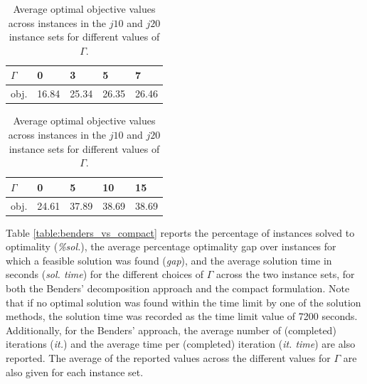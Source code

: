 \documentclass[a4paper,abstracton]{scrartcl}
\begin{document}
\begin{table}[h]
	\centering
	{\renewcommand{\arraystretch}{1.2}  %
	\begin{subtable}{.45\linewidth}
	\begin{tabular}{lllll}
		\hline\hline
		$\Gamma$  & 0     & 3     & 5     & 7 \\
		\hline
		obj. & 16.84 & 25.34 & 26.35 & 26.46 \\               
		\hline\hline
	\end{tabular}
	\caption{$j10$}
	\label{table:j10_objvals}
	\end{subtable}%
	\qquad
	\begin{subtable}{.45\linewidth}
	\begin{tabular}{lllll}
		\hline\hline
		$\Gamma$  & 0     & 5     & 10     & 15 \\
		\hline
		obj. & 24.61 & 37.89 & 38.69 & 38.69 \\               
		\hline\hline
	\end{tabular}
	\caption{$j20$}
	\label{table:j20_objvals}
	\end{subtable}
	\caption{Average optimal objective values across instances in the $j10$ and $j20$ instance sets for different values of $\Gamma$.}
	\label{table:objvals}
	}
\end{table}

Table \ref{table:benders_vs_compact} reports the percentage of instances solved to optimality (\textit{\%sol.}), the average percentage optimality gap over instances for which a feasible solution was found (\textit{gap}), and the average solution time in seconds (\textit{sol. time}) for the different choices of $\Gamma$ across the two instance sets, for both the Benders' decomposition approach and the compact formulation. Note that if no optimal solution was found within the time limit by one of the solution methods, the solution time was recorded as the time limit value of 7200 seconds. Additionally, for the Benders' approach, the average number of (completed) iterations (\textit{it.}) and the average time per (completed) iteration (\textit{it. time}) are also reported. The average of the reported values across the different values for $\Gamma$ are also given for each instance set. 

\end{document}
